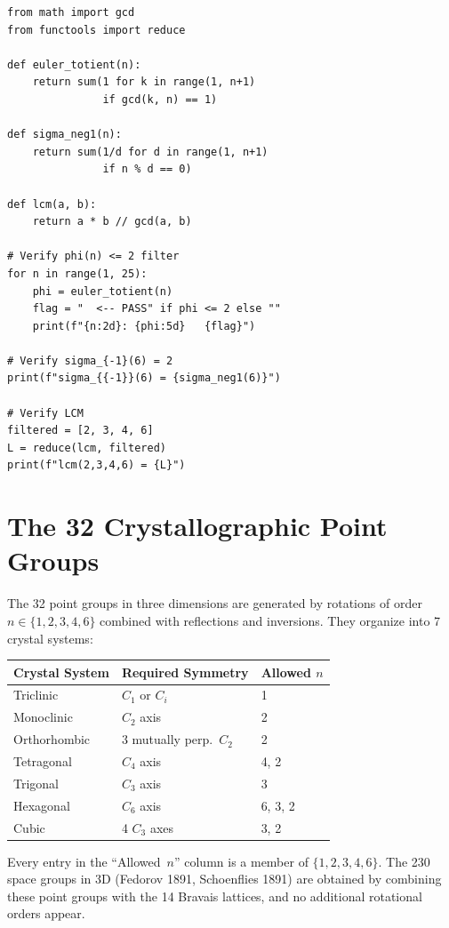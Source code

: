 \documentclass[preprint]{revtex4-2}
\begin{document}
\begin{verbatim}
from math import gcd
from functools import reduce

def euler_totient(n):
    return sum(1 for k in range(1, n+1)
               if gcd(k, n) == 1)

def sigma_neg1(n):
    return sum(1/d for d in range(1, n+1)
               if n % d == 0)

def lcm(a, b):
    return a * b // gcd(a, b)

# Verify phi(n) <= 2 filter
for n in range(1, 25):
    phi = euler_totient(n)
    flag = "  <-- PASS" if phi <= 2 else ""
    print(f"{n:2d}: {phi:5d}   {flag}")

# Verify sigma_{-1}(6) = 2
print(f"sigma_{{-1}}(6) = {sigma_neg1(6)}")

# Verify LCM
filtered = [2, 3, 4, 6]
L = reduce(lcm, filtered)
print(f"lcm(2,3,4,6) = {L}")
\end{verbatim}

\section{The 32 Crystallographic Point Groups}\label{app:crystal}

The 32 point groups in three dimensions are generated by rotations of order $n \in \{1, 2, 3, 4, 6\}$ combined with reflections and inversions. They organize into 7 crystal systems:

\begin{center}
\begin{tabular}{lll}
\toprule
Crystal System & Required Symmetry & Allowed $n$ \\
\midrule
Triclinic & $C_1$ or $C_i$ & 1 \\
Monoclinic & $C_2$ axis & 2 \\
Orthorhombic & 3 mutually perp.\ $C_2$ & 2 \\
Tetragonal & $C_4$ axis & 4, 2 \\
Trigonal & $C_3$ axis & 3 \\
Hexagonal & $C_6$ axis & 6, 3, 2 \\
Cubic & 4 $C_3$ axes & 3, 2 \\
\bottomrule
\end{tabular}
\end{center}

Every entry in the ``Allowed~$n$'' column is a member of $\{1, 2, 3, 4, 6\}$. The 230 space groups in 3D (Fedorov 1891, Schoenflies 1891) are obtained by combining these point groups with the 14 Bravais lattices, and no additional rotational orders appear.
\end{document}

